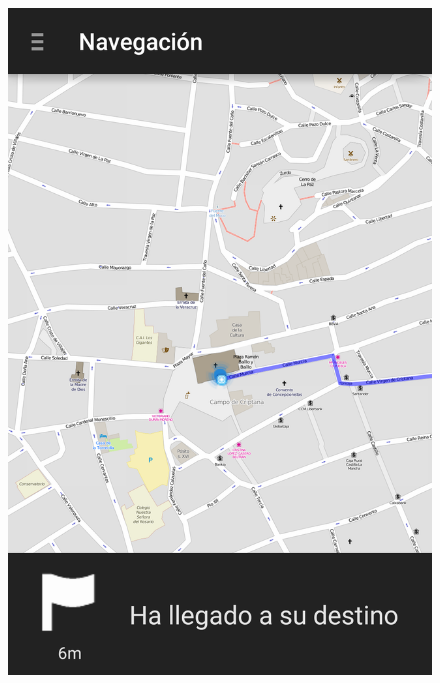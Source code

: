 \begin{slide}
\begin{center}
\begin{minipage}[b]{0.3\linewidth}
\begin{center}
\begin{figure}
          \includegraphics[height=0.65\textheight]{img/naviganto-rutafin.png}
        \end{figure}
      \end{center}
    \end{minipage}
  \end{center}
\end{slide}

